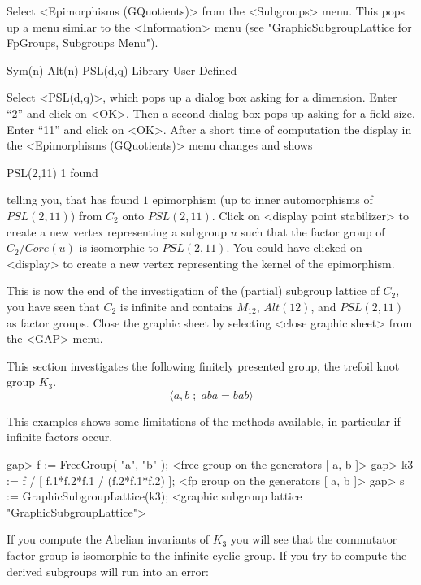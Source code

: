 Select  <Epimorphisms (GQuotients)> from  the  <Subgroups> menu.  This
pops  up   a   menu   similar  to    the  <Information>   menu    (see
"GraphicSubgroupLattice for FpGroups, Subgroups Menu").

\begintt
Sym(n)
Alt(n)
PSL(d,q)
Library
User Defined 
\endtt

Select <PSL(d,q)>, which pops up a dialog  box asking for a dimension. 
Enter ``2'' and click on <OK>. Then a second dialog box pops up asking
for a field size.  Enter ``11'' and click on  <OK>. After a short time
of  computation the display  in  the <Epimorphisms (GQuotients)>  menu
changes and shows

\begintt
PSL(2,11)      1 found
\endtt

telling you, that {\GAP} has found $1$ epimorphism (up to inner
automorphisms of $PSL(2,11)$) from $C_2$ onto $PSL(2,11)$.  Click on
<display point stabilizer> to create a new vertex representing a subgroup
$u$ such that the factor group of $C_2 / Core(u)$ is isomorphic to
$PSL(2,11)$. You could have clicked on <display> to create a new vertex
representing the kernel of the epimorphism.

This  is now  the  end of  the investigation   of the (partial)  subgroup
lattice  of $C_2$, you have  seen  that $C_2$   is infinite and  contains
$M_{12}$, $Alt(12)$, and $PSL(2,11)$ as factor groups.  Close the graphic
sheet by selecting <close graphic sheet> from the <GAP> menu.



This  section  investigates the  following  finitely presented group, the
trefoil knot group $K_3$.
$$
    \langle a, b \;;\; aba = bab \rangle
$$

This examples shows some  limitations   of the methods available,   in
particular if infinite factors occur.

\begintt
gap> f := FreeGroup( "a", "b" );
<free group on the generators [ a, b ]>
gap> k3 := f / [ f.1*f.2*f.1 / (f.2*f.1*f.2) ];
<fp group on the generators [ a, b ]>
gap> s := GraphicSubgroupLattice(k3);
<graphic subgroup lattice "GraphicSubgroupLattice">
\endtt

If you compute the   Abelian invariants of  $K_3$  you will see  that the
commutator factor group  is isomorphic to the  infinite cyclic group.  If
you try  to compute the   derived subgroups  {\GAP}  will run into an
error:

